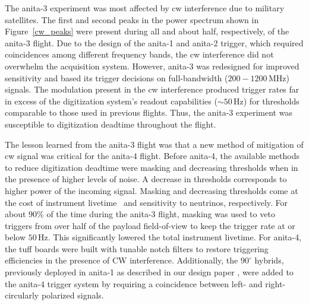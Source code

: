 The \gls{anita}-3 experiment was most affected by \gls{cw} interference due to military satellites. The first and second peaks in the power spectrum shown in Figure~\ref{cw_peaks} were present during all and about half, respectively, of the \gls{anita}-3 flight.
Due to the design
of the \gls{anita}-1 and \gls{anita}-2 trigger, which required coincidences among different frequency bands, the \gls{cw} interference did not overwhelm
the acquisition system. 
However, \gls{anita}-3 was redesigned for improved sensitivity and based its trigger decisions on full-bandwidth ($200 - 1200\,\mbox{MHz}$) signals. 
The modulation present in the \gls{cw} interference produced trigger rates far in excess of the digitization system's readout capabilities ($\sim50\,\mbox{Hz}$) for thresholds comparable to those used in previous flights. 
Thus, the \gls{anita}-3 experiment was susceptible to digitization deadtime throughout the flight. 

The lesson learned from the \gls{anita}-3 flight was
that a new method of mitigation of \gls{cw} signal was critical for the \gls{anita}-4 flight. 
Before \gls{anita}-4, the available methods to reduce digitization deadtime were masking
and decreasing thresholds when in the presence of higher levels of noise. 
A decrease in thresholds corresponds to higher power of the incoming signal. 
Masking and decreasing thresholds
come at the cost of instrument livetime~\cite{tuff} and sensitivity to neutrinos, respectively. 
For about 90\% of the time during the \gls{anita}-3 flight,
masking was used 
to veto triggers from
over 
half of the payload field-of-view to keep the
trigger rate at or below $50\,\mbox{Hz}$. 
This significantly lowered the total instrument livetime. 
For \gls{anita}-4, the \gls{tuff} boards were built with
tunable notch filters to restore triggering efficiencies 
in the presence of CW interference. 
Additionally, the $90^{\circ}$ hybrids, previously deployed in \gls{anita}-1 as described in our design paper \cite{instrPaper}, were added to the \gls{anita}-4 trigger system by requiring a coincidence between left- and right- circularly polarized signals.
 
